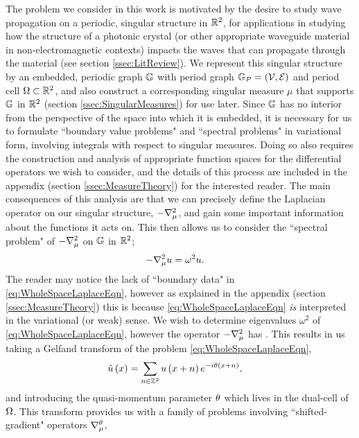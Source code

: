 The problem we consider in this work is motivated by the desire to study wave propagation on a periodic, singular structure in $\mathbb{R}^2$, for applications in studying how the structure of a photonic crystal (or other appropriate waveguide material in non-electromagnetic contexts) impacts the waves that can propagate through the material (see section \ref{ssec:LitReview}).
We represent this singular structure by an embedded, periodic graph $\mathbb{G}$ with period graph $\mathbb{G}_{\mathcal{P}}=\left( \mathcal{V}, \mathcal{E} \right)$ and period cell $\Omega\subset\mathbb{R}^2$, and also construct a corresponding singular measure $\mu$ that supports $\mathbb{G}$ in $\mathbb{R}^2$ (section \ref{ssec:SingularMeasures}) for use later.
Since $\mathbb{G}$ has no interior from the perspective of the space into which it is embedded, it is necessary for us to formulate ``boundary value problems" and ``spectral problems" in variational form, involving integrals with respect to singular measures.
Doing so also requires the construction and analysis of appropriate function spaces for the differential operators we wish to consider, and the details of this process are included in the appendix (section  \ref{ssec:MeasureTheory}) for the interested reader.
The main consequences of this analysis are that we can precisely define the Laplacian operator on our singular structure, $-\nabla^2_{\mu}$, and gain some important information about the functions it acts on.
This then allows us to consider the ``spectral problem" of $-\nabla^2_{\mu}$ on $\mathbb{G}$ in $\mathbb{R}^2$;
\begin{align} \label{eq:WholeSpaceLaplaceEqn}
	-\nabla^2_{\mu} u &= \omega^2 u.
\end{align}
The reader may notice the lack of ``boundary data" in \eqref{eq:WholeSpaceLaplaceEqn}, however as explained in the appendix (section \ref{ssec:MeasureTheory}) this is because \eqref{eq:WholeSpaceLaplaceEqn} \emph{is} interpreted in the variational (or weak) sense.
We wish to determine eigenvalues $\omega^2$ of \eqref{eq:WholeSpaceLaplaceEqn}, however the operator $-\nabla^2_{\mu}$ has .
This results in us taking a Gelfand transform of the problem \eqref{eq:WholeSpaceLaplaceEqn}, 
\begin{align*}
	\hat{u}\left( x \right) &= \sum_{n\in\mathbb{Z}^2}u\left( x+n \right)e^{-i\theta\left( x+n \right)},
\end{align*}
and introducing the quasi-momentum parameter $\theta$ which lives in the dual-cell of $\Omega$.
This transform provides us with a family of problems involving ``shifted-gradient" operators $\nabla^{\theta}_{\mu}$,
